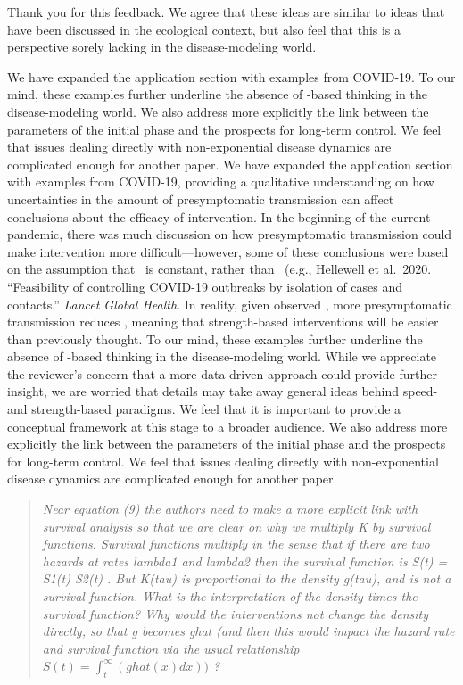 Thank you for this feedback. We agree that these ideas are similar to
ideas that have been discussed in the ecological context, but also feel
that this is a perspective sorely lacking in the disease-modeling world.

We have expanded the application section with examples from COVID-19. To
our mind, these examples further underline the absence of \rr-based
thinking in the disease-modeling world. We also address more explicitly
the link between the parameters of the initial phase and the prospects
for long-term control. We feel that issues dealing directly with
non-exponential disease dynamics are complicated enough for another
paper.
We have expanded the
application section with examples from COVID-19, providing a qualitative
understanding on how uncertainties in the amount of presymptomatic
transmission can affect conclusions about the efficacy of intervention.
In the beginning of the current pandemic, there was much discussion on
how presymptomatic transmission could make intervention more
difficult---however, some of these conclusions were based on the
assumption that \RR\ is constant, rather than \rr\ (e.g., Hellewell et
al.~2020. ``Feasibility of controlling COVID-19 outbreaks by isolation
of cases and contacts.'' \emph{ Lancet Global Health}. In reality, given
observed \rr, more presymptomatic transmission reduces \RR, meaning that
strength-based interventions will be easier than previously thought. To
our mind, these examples further underline the absence of \rr-based
thinking in the disease-modeling world. While we appreciate the
reviewer's concern that a more data-driven approach could provide
further insight, we are worried that details may take away general ideas
behind speed- and strength-based paradigms. We feel that it is important
to provide a conceptual framework at this stage to a broader audience.
We also address more explicitly the link between the parameters of the
initial phase and the prospects for long-term control. We feel that
issues dealing directly with non-exponential disease dynamics are
complicated enough for another paper.

\begin{quote}\sl
Near equation (9) the authors need to make a more explicit link with
survival analysis so that we are clear on why we multiply K by survival
functions. Survival functions multiply in the sense that if there are
two hazards at rates lambda1 and lambda2 then the survival function is
S(t) = S1(t) S2(t) . But K(tau) is proportional to the density g(tau),
and is not a survival function. What is the interpretation of the
density times the survival function? Why would the interventions not
change the density directly, so that g becomes ghat (and then this would
impact the hazard rate and survival function via the usual relationship
$S(t) = \int_t ^\infty ( ghat (x) dx )  )$ ?
\end{quote}

